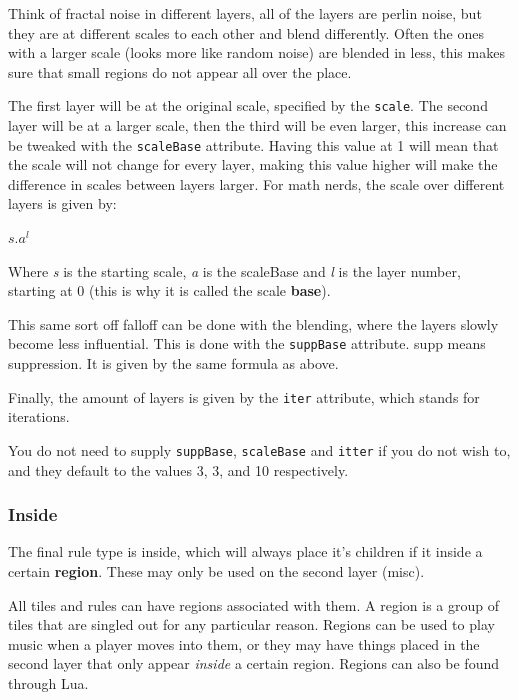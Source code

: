 \documentclass{book}
\begin{document}
Think of fractal noise in different layers, all of the layers are perlin noise, but they are at different scales to each other and blend differently. Often the ones with a larger scale (looks more like random noise) are blended in less, this makes sure that small regions do not appear all over the place.

The first layer will be at the original scale, specified by the \texttt{scale}. The second layer will be at a larger scale, then the third will be even larger, this increase can be tweaked with the \texttt{scaleBase} attribute. Having this value at 1 will mean that the scale will not change for every layer, making this value higher will make the difference in scales between layers larger. For math nerds, the scale over different layers is given by:

\begin{center}
	\begin{math}
		s.a^{l}
	\end{math}
\end{center}

Where \textit{s} is the starting scale, \textit{a} is the scaleBase and \textit{l} is the layer number, starting at 0 (this is why it is called the scale \textbf{base}).

This same sort off falloff can be done with the blending, where the layers slowly become less influential. This is done with the \texttt{suppBase} attribute. supp means suppression. It is given by the same formula as above.

Finally, the amount of layers is given by the \texttt{iter} attribute, which stands for iterations.

You do not need to supply \texttt{suppBase}, \texttt{scaleBase} and \texttt{itter} if you do not wish to, and they default to the values 3, 3, and 10 respectively.

\subsubsection{Inside}
The final rule type is inside, which will always place it's children if it inside a certain \textbf{region}. These may only be used on the second layer (misc).

All tiles and rules can have regions associated with them. A region is a group of tiles that are singled out for any particular reason. Regions can be used to play music when a player moves into them, or they may have things placed in the second layer that only appear \textit{inside} a certain region. Regions can also be found through Lua.
\end{document}
